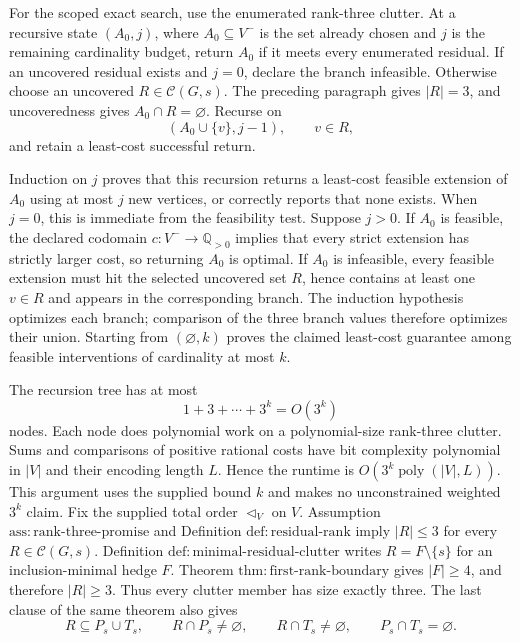 For the scoped exact search, use the enumerated rank-three clutter.  At a recursive state \((A_0,j)\), where \(A_0\subseteq V^{-}\) is the set already chosen and \(j\) is the remaining cardinality budget, return \(A_0\) if it meets every enumerated residual.  If an uncovered residual exists and \(j=0\), declare the branch infeasible.  Otherwise choose an uncovered \(R\in\mathcal C(G,s)\).  The preceding paragraph gives \(|R|=3\), and uncoveredness gives \(A_0\cap R=\varnothing\).  Recurse on
\[
 (A_0\cup\{v\},j-1),\qquad v\in R,
\]
and retain a least-cost successful return.

Induction on \(j\) proves that this recursion returns a least-cost feasible extension of \(A_0\) using at most \(j\) new vertices, or correctly reports that none exists.  When \(j=0\), this is immediate from the feasibility test.  Suppose \(j>0\).  If \(A_0\) is feasible, the declared codomain \(c:V^{-}\to\mathbb Q_{>0}\) implies that every strict extension has strictly larger cost, so returning \(A_0\) is optimal.  If \(A_0\) is infeasible, every feasible extension must hit the selected uncovered set \(R\), hence contains at least one \(v\in R\) and appears in the corresponding branch.  The induction hypothesis optimizes each branch; comparison of the three branch values therefore optimizes their union.  Starting from \((\varnothing,k)\) proves the claimed least-cost guarantee among feasible interventions of cardinality at most \(k\).

The recursion tree has at most
\[
 1+3+\cdots+3^k=O(3^k)
\]
nodes.  Each node does polynomial work on a polynomial-size rank-three clutter.  Sums and comparisons of positive rational costs have bit complexity polynomial in \(|V|\) and their encoding length \(L\).  Hence the runtime is \(O(3^k\operatorname{poly}(|V|,L))\).  This argument uses the supplied bound \(k\) and makes no unconstrained weighted \(3^k\) claim.
Fix the supplied total order \(\triangleleft_V\) on \(V\).  Assumption \(\mathrm{ass{:}rank\mbox{-}three\mbox{-}promise}\) and Definition \(\mathrm{def{:}residual\mbox{-}rank}\) imply \(|R|\leq3\) for every \(R\in\mathcal C(G,s)\).  Definition \(\mathrm{def{:}minimal\mbox{-}residual\mbox{-}clutter}\) writes \(R=F\setminus\{s\}\) for an inclusion-minimal hedge \(F\).  Theorem \(\mathrm{thm{:}first\mbox{-}rank\mbox{-}boundary}\) gives \(|F|\geq4\), and therefore \(|R|\geq3\).  Thus every clutter member has size exactly three.  The last clause of the same theorem also gives
\[
 R\subseteq P_s\cup T_s,
 \qquad R\cap P_s\neq\varnothing,
 \qquad R\cap T_s\neq\varnothing,
 \qquad P_s\cap T_s=\varnothing.
\]

